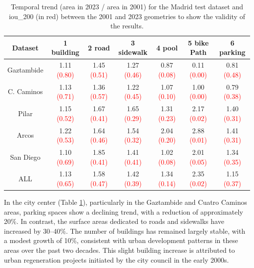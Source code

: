 \begin{refsection}
\begin{table}[!htb]
\centering
\small
\caption{Temporal trend (area in 2023 / area in 2001) for the Madrid test dataset and iou\_200 (in red) between the 2001 and 2023 geometries to show the validity of the results.}
\label{tab:mad2001}
\begin{tabular}{|c|c|c|c|c|c|c|}
    \hline
    \textbf{Dataset} & \textbf{1 building} & \textbf{2 road} & \textbf{3 sidewalk} & \textbf{4 pool} & \textbf{5 bike Path} & \textbf{6 parking} \\
    \hline
    Gaztambide & 1.11 \textcolor{red}{(0.80)} & 1.45 \textcolor{red}{(0.51)} & 1.27 \textcolor{red}{(0.46)} & 0.87 \textcolor{red}{(0.08)} & 0.11 \textcolor{red}{(0.00)} & 0.81 \textcolor{red}{(0.48)} \\
    \hline
    C. Caminos & 1.13 \textcolor{red}{(0.71)} & 1.36 \textcolor{red}{(0.57)} & 1.22 \textcolor{red}{(0.45)} & 1.07 \textcolor{red}{(0.10)} & 1.00 \textcolor{red}{(0.00)} & 0.79 \textcolor{red}{(0.38)} \\
    \hline
    Pilar & 1.15 \textcolor{red}{(0.52)} & 1.67 \textcolor{red}{(0.41)} & 1.65 \textcolor{red}{(0.29)} & 1.31 \textcolor{red}{(0.23)} & 2.17 \textcolor{red}{(0.02)} & 1.40 \textcolor{red}{(0.31)} \\
    \hline
    Arcos & 1.22 \textcolor{red}{(0.53)} & 1.64 \textcolor{red}{(0.46)} & 1.54 \textcolor{red}{(0.32)} & 2.04 \textcolor{red}{(0.20)} & 2.88 \textcolor{red}{(0.01)} & 1.41 \textcolor{red}{(0.31)} \\
    \hline
    San Diego & 1.10 \textcolor{red}{(0.69)} & 1.85 \textcolor{red}{(0.41)} & 1.41 \textcolor{red}{(0.41)} & 1.02 \textcolor{red}{(0.08)} & 2.01 \textcolor{red}{(0.05)} & 1.34 \textcolor{red}{(0.35)} \\
    \hline
    ALL & 1.13 \textcolor{red}{(0.65)} & 1.58 \textcolor{red}{(0.47)} & 1.42 \textcolor{red}{(0.39)} & 1.34 \textcolor{red}{(0.14)} & 2.35 \textcolor{red}{(0.02)} & 1.15 \textcolor{red}{(0.37)} \\
    \hline
\end{tabular}
\end{table}

In the city center (Table \ref{tab:mad2001}), particularly in the Gaztambide and Cuatro Caminos areas, parking spaces show a declining trend, with a reduction of approximately 20\%. In contrast, the surface areas dedicated to roads and sidewalks have increased by 30–40\%. The number of buildings has remained largely stable, with a modest growth of 10\%, consistent with urban development patterns in these areas over the past two decades. This slight building increase is attributed to urban regeneration projects initiated by the city council in the early 2000s.


\end{refsection}
